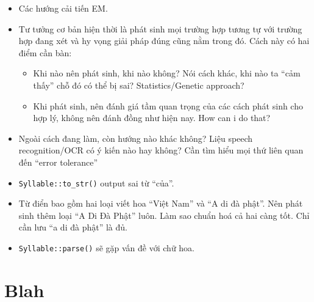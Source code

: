 \documentclass[a4paper,oneside,14pt]{extbook} %
\begin{document}
\begin{itemize}
\item Các hướng cải tiến EM.
\item Tư tưởng cơ bản hiện thời là phát sinh mọi trường hợp tương tự
  với trường hợp đang xét và hy vọng giải pháp đúng cũng nằm trong
  đó. Cách này có hai điểm cần bàn:
  \begin{itemize}
  \item Khi nào nên phát sinh, khi nào không? Nói cách khác, khi nào
    ta ``cảm thấy'' chỗ đó có thể bị sai? Statistics/Genetic approach?
  \item Khi phát sinh, nên đánh giá tầm quan trọng của các cách phát
    sinh  cho hợp lý, không nên đánh đồng như hiện nay. How can i do
    that? 
  \end{itemize}
\item Ngoài cách đang làm, còn hướng nào khác không? Liệu speech
  recognition/OCR có ý kiến nào hay không? Cần tìm hiểu mọi thứ liên
  quan đến ``error tolerance''
\item \verb#Syllable::to_str()# output sai từ ``của''.
\item Từ điển bao gồm hai loại viết hoa ``Việt Nam'' và ``A di đà
  phật''. Nên phát sinh thêm loại ``A Di Đà Phật'' luôn. Làm sao chuẩn
  hoá cả hai càng tốt. Chỉ cần lưu ``a di đà phật'' là đủ.
\item \verb#Syllable::parse()# sẽ gặp vấn đề với chữ hoa.
\end{itemize}

\appendix\eject{}
\chapter{Blah}

\eject{}\listoffigures

\eject{}\listoftables

\eject{}


\end{document}
